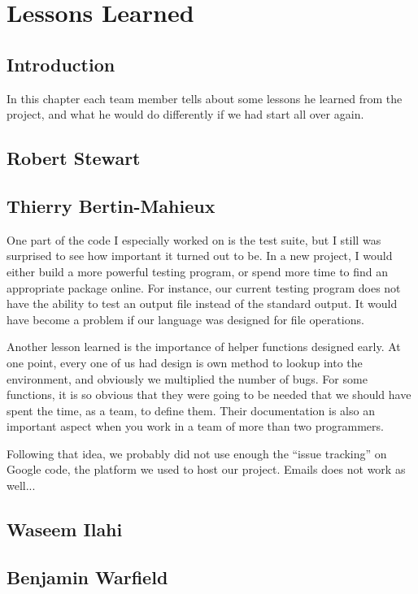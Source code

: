 
\chapter{Lessons Learned}


\section{Introduction}
In this chapter each team member tells about some lessons he learned from
the project, and what he would do differently if we had start all over
again.


\section{Robert Stewart}


\section{Thierry Bertin-Mahieux}
One part of the code I especially worked on is the test suite, but I still
was surprised to see how important it turned out to be. In a new project,
I would either build a more powerful testing program, or spend more
time to find an appropriate package online. For instance, our current
testing program does not have the ability to test an output file instead
of the standard output. It would have become a problem if our language was
designed for file operations.

Another lesson learned is the importance of helper functions designed early.
At one point, every one of us had design is own method to lookup into the
environment, and obviously we multiplied the number of bugs. For some
functions, it is so obvious that they were going to be needed that we should
have spent the time, as a team, to define them. Their documentation is
also an important aspect when you work in a team of more than two programmers.

Following that idea, we probably did not use enough the ``issue tracking''
on Google code, the platform we used to host our project. Emails does not
work as well...


\section{Waseem Ilahi}


\section{Benjamin Warfield}


